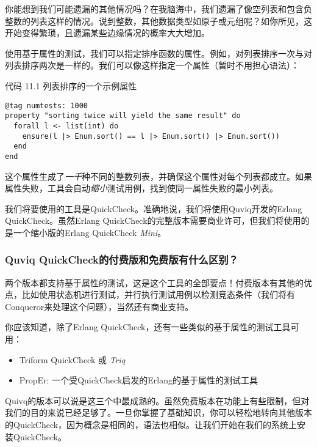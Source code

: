 你能想到我们可能遗漏的其他情况吗？在我脑海中，我们遗漏了像空列表和包含负整数的列表这样的情况。说到整数，其他数据类型如原子或元组呢？如你所见，这开始变得繁琐，且遗漏某些边缘情况的概率大大增加。

使用基于属性的测试，我们可以指定排序函数的属性。例如，对列表排序一次与对列表排序两次是一样的。我们可以像这样指定一个属性（暂时不用担心语法）：

\begin{code}{代码 11.1 列表排序的一个示例属性}
\begin{verbatim}
@tag numtests: 1000
property "sorting twice will yield the same result" do
  forall l <- list(int) do
    ensure(l |> Enum.sort() == l |> Enum.sort() |> Enum.sort())
  end
end
\end{verbatim}
\label{lst:list_sorting_example_property}
\end{code}

这个属性生成了\emph{一千}种不同的整数列表，并确保这个属性对每个列表都成立。如果属性失败，工具会自动\emph{缩小}测试用例，找到使同一属性失败的最小列表。

我们将要使用的工具是QuickCheck。准确地说，我们将使用Quviq开发的Erlang QuickCheck。虽然Erlang QuickCheck的完整版本需要商业许可，但我们将使用的是一个缩小版的Erlang QuickCheck \emph{Mini}。

\subsubsection{Quviq QuickCheck的付费版和免费版有什么区别？}

两个版本都支持基于属性的测试，这是这个工具的全部要点！付费版本有其他的优点，比如使用状态机进行测试，并行执行测试用例以检测竞态条件（我们将有Conqueror来处理这个问题），当然还有商业支持。

你应该知道，除了Erlang QuickCheck，还有一些类似的基于属性的测试工具可用：

\begin{itemize}

\item  Triform QuickCheck 或 \emph{Triq}
\item  PropEr:  一个受QuickCheck启发的Erlang的基于属性的测试工具
\end{itemize}

Quivq的版本可以说是这三个中最成熟的。虽然免费版本在功能上有些限制，但对我们的目的来说已经足够了。一旦你掌握了基础知识，你可以轻松地转向其他版本的QuickCheck，因为概念是相同的，语法也相似。让我们开始在我们的系统上安装QuickCheck。

